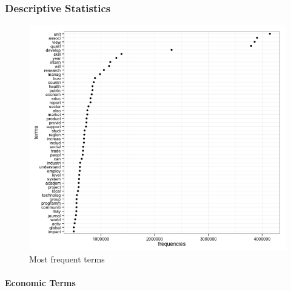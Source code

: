 \documentclass[11pt,article,oneside]{memoir}
\makeatletter
\def\maxwidth{\ifdim\Gin@nat@width>\linewidth\linewidth
\else\Gin@nat@width\fi}
\let\Oldincludegraphics\includegraphics
\renewcommand{\includegraphics}[1]{\Oldincludegraphics[width=\maxwidth]{#1}}
\makeatother
\begin{document}
\subsubsection{Descriptive Statistics}\label{descriptive-statistics}

\begin{figure}[htbp]
\centering
\includegraphics{figure/globalisation_frequency_plot.png}
\caption{Most frequent terms}
\end{figure}

\pagebreak

\paragraph{Economic Terms}\label{economic-terms}
\end{document}

